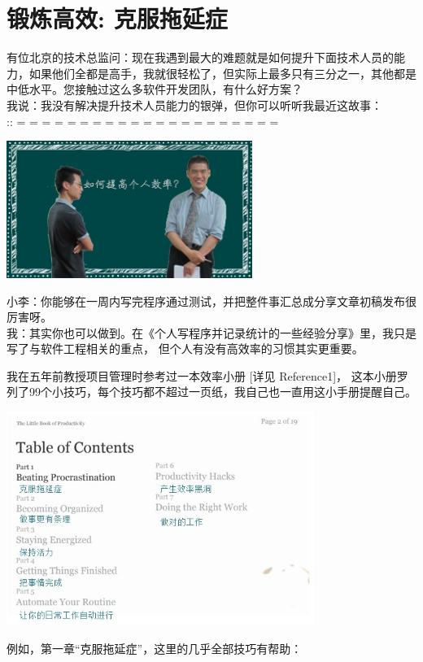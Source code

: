 \chapter[克服拖延症]{锻炼高效: 克服拖延症}  %

有位北京的技术总监问：现在我遇到最大的难题就是如何提升下面技术人员的能力，如果他们全都是高手，我就很轻松了，但实际上最多只有三分之一，其他都是中低水平。您接触过这么多软件开发团队，有什么好方案？\\
我说：我没有解决提升技术人员能力的银弹，但你可以听听我最近这故事：\\
:: = = = = = = = = = = = = = = = = = = = = =

\includegraphics[width=8cm]{小李图.jpg}

小李：你能够在一周内写完程序通过测试，并把整件事汇总成分享文章初稿发布很厉害呀。\\
我：其实你也可以做到。在《个人写程序并记录统计的一些经验分享》里，我只是写了与软件工程相关的重点，
但个人有没有高效率的习惯其实更重要。

我在五年前教授项目管理时参考过一本效率小册 {[}详见 Reference1{]}，
这本小册罗列了99个小技巧，每个技巧都不超过一页纸，我自己也一直用这小手册提醒自己。

\includegraphics[width=10cm]{超效率目录.jpg}

例如，第一章``克服拖延症''，这里的几乎全部技巧有帮助：\\

